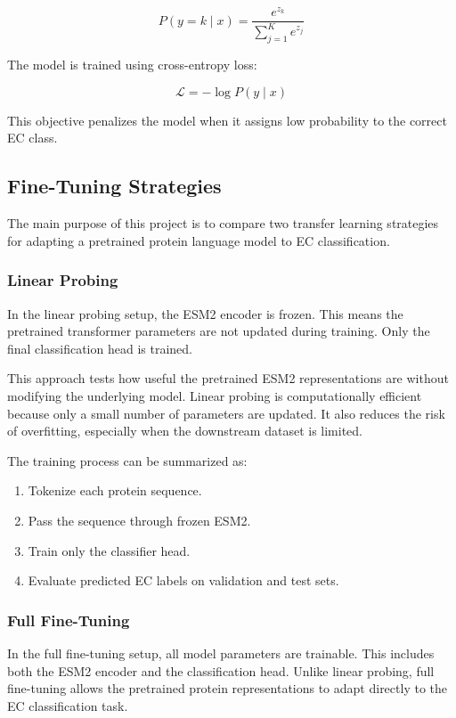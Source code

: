 \documentclass{article}
\begin{document}
\[
P(y = k \mid x) = \frac{e^{z_k}}{\sum_{j=1}^{K} e^{z_j}}
\]

The model is trained using cross-entropy loss:

\[
\mathcal{L} = - \log P(y \mid x)
\]

This objective penalizes the model when it assigns low probability to the correct EC class.

\subsection{Fine-Tuning Strategies}

The main purpose of this project is to compare two transfer learning strategies for adapting a pretrained protein language model to EC classification.

\subsubsection{Linear Probing}

In the linear probing setup, the ESM2 encoder is frozen. This means the pretrained transformer parameters are not updated during training. Only the final classification head is trained.

This approach tests how useful the pretrained ESM2 representations are without modifying the underlying model. Linear probing is computationally efficient because only a small number of parameters are updated. It also reduces the risk of overfitting, especially when the downstream dataset is limited.

The training process can be summarized as:
\begin{enumerate}
    \item Tokenize each protein sequence.
    \item Pass the sequence through frozen ESM2.
    \item Train only the classifier head.
    \item Evaluate predicted EC labels on validation and test sets.
\end{enumerate}

\subsubsection{Full Fine-Tuning}

In the full fine-tuning setup, all model parameters are trainable. This includes both the ESM2 encoder and the classification head. Unlike linear probing, full fine-tuning allows the pretrained protein representations to adapt directly to the EC classification task.
\end{document}
